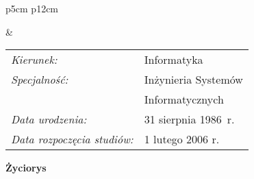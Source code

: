 \begin{titlepage}
    \newpage\thispagestyle{empty}
    \begin{tabular}{p{5cm} p{12cm}}
    \begin{minipage}{5cm}
    \center
    \end{minipage}
    &
    \begin{minipage}{12cm}
    \begin{flushleft}
    \par\noindent\vspace{1\baselineskip}
    \begin{tabular}[h]{l l}
    {\it Kierunek:}       & Informatyka \\[12pt]
    {\it Specjalność:}    & Inżynieria Systemów \\
                          & Informatycznych \\[12pt]
    {\it Data urodzenia:} & 31 sierpnia 1986~r. \\[12pt]
    {\it Data rozpoczęcia studiów:} & 1 lutego 2006 r. \\
    \end{tabular}
    \par\noindent\vspace{1\baselineskip}
    \end{flushleft}
    \end{minipage}
    \end{tabular}
    \vspace*{1\baselineskip}
    \begin{center}
        {\large\bfseries Życiorys}\par\bigskip
    \end{center}


\end{titlepage}

